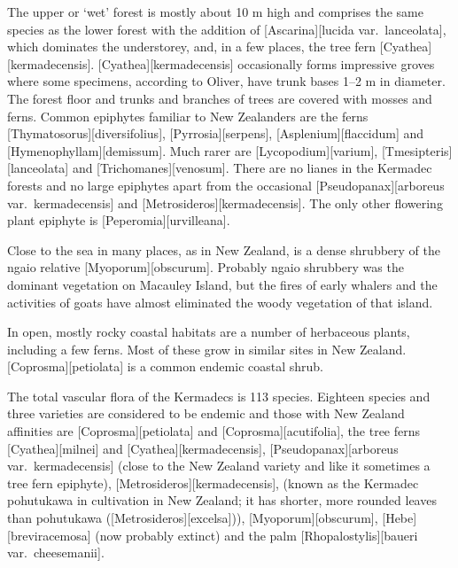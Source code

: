 The upper or `wet' forest is mostly about 10 m high and comprises the same species as the lower forest with the addition of [Ascarina][lucida var.\ lanceolata], which dominates the understorey, and, in a few places, the tree fern [Cyathea][kermadecensis]. [Cyathea][kermadecensis] occasionally forms impressive groves where some specimens, according to Oliver, have trunk bases 1–2 m in diameter.
The forest floor and trunks and branches of trees are covered with mosses and ferns.
Common epiphytes familiar to New Zealanders are the ferns [Thymatosorus][diversifolius], [Pyrrosia][serpens], [Asplenium][flaccidum] and [Hymenophyllam][demissum].
Much rarer are [Lycopodium][varium], [Tmesipteris][lanceolata] and [Trichomanes][venosum].
There are no lianes in the Kermadec forests and no large epiphytes apart from the occasional [Pseudopanax][arboreus var.\ kermadecensis] and [Metrosideros][kermadecensis].
The only other flowering plant epiphyte is [Peperomia][urvilleana].

Close to the sea in many places, as in New Zealand, is a dense shrubbery of the ngaio relative [Myoporum][obscurum].
Probably ngaio shrubbery was the dominant vegetation on Macauley Island, but the fires of early whalers and the activities of goats have almost eliminated the woody vegetation of that island.

In open, mostly rocky coastal habitats are a number of herbaceous plants, including a few ferns.
Most of these grow in similar sites in New Zealand. [Coprosma][petiolata] is a common endemic coastal shrub.

The total vascular flora of the Kermadecs is 113 species.
Eighteen species and three varieties are considered to be endemic and those with New Zealand affinities are [Coprosma][petiolata] and [Coprosma][acutifolia], the tree ferns [Cyathea][milnei] and [Cyathea][kermadecensis],  [Pseudopanax][arboreus var.\ kermadecensis] (close to the New Zealand variety and like it sometimes a tree fern epiphyte), [Metrosideros][kermadecensis], (known as the Kermadec pohutukawa in cultivation in New Zealand; it has shorter, more rounded leaves than pohutukawa ([Metrosideros][excelsa])), [Myoporum][obscurum], [Hebe][breviracemosa] (now probably extinct) and the palm [Rhopalostylis][baueri var.\ cheesemanii].

